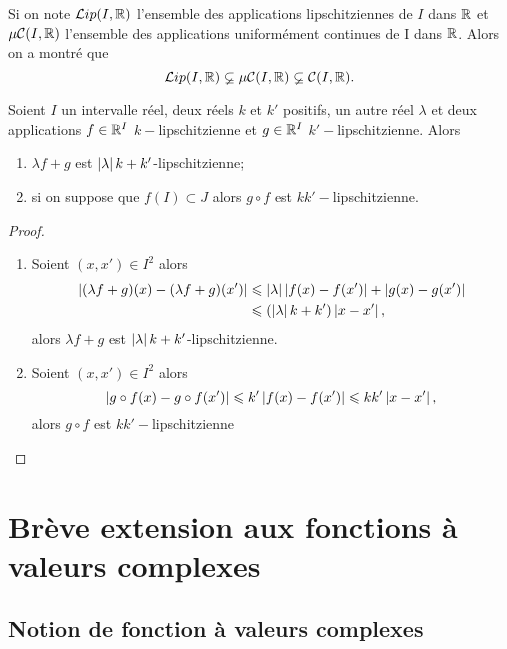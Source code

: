 Si on note \(\mathcal{L}ip(I,\mathbb{R})\) l'ensemble des applications lipschitziennes de \(I\) dans \(\mathbb{R}\) et \(\mu\mathcal{C}(I,\mathbb{R})\) l'ensemble des applications uniformément continues de I dans \(\mathbb{R}\). Alors on a montré que
\begin{equation}
  \mathcal{L}ip(I,\mathbb{R}) \varsubsetneq \mu\mathcal{C}(I,\mathbb{R}) \varsubsetneq \mathcal{C}(I,\mathbb{R}).
\end{equation}

\begin{prop}
  Soient \(I\) un intervalle réel, deux réels \(k\) et \(k'\) positifs, un autre réel \(\lambda\) et deux applications \(f\in \mathbb{R}^I\) \(k-\)lipschitzienne et \(g\in \mathbb{R}^I\) \(k'-\)lipschitzienne. Alors
  \begin{enumerate}
  \item \(\lambda f+g\) est \(\left\lvert\lambda\right\rvert k+k'\)-lipschitzienne;
  \item si on suppose que \(f(I) \subset J\) alors \(g \circ f\) est \(kk'-\)lipschitzienne.
  \end{enumerate}
\end{prop}
\begin{proof}
  \begin{enumerate}
  \item Soient \((x,x') \in I^2\) alors
    \begin{align}
      \left\lvert(\lambda f+g)(x)-(\lambda f+g)(x')\right\rvert &\leqslant \left\lvert\lambda\right\rvert \left\lvert f(x)-f(x')\right\rvert+\left\lvert g(x)-g(x')\right\rvert\\
      &\leqslant (\left\lvert\lambda\right\rvert k+k')\left\lvert x-x'\right\rvert,
    \end{align}
    alors \(\lambda f+g\) est \(\left\lvert\lambda\right\rvert k+k'\)-lipschitzienne.
  \item Soient \((x,x') \in I^2\) alors
    \begin{equation}
      \left\lvert g \circ f(x)-g \circ f(x')\right\rvert \leqslant k' \left\lvert f(x)-f(x')\right\rvert \leqslant kk' \left\lvert x-x'\right\rvert,
    \end{equation}
    alors \(g \circ f\) est \(kk'-\)lipschitzienne
  \end{enumerate}
\end{proof}

\section[Brève extension aux fonctions complexes]{Brève extension aux fonctions à valeurs complexes}

\subsection{Notion de fonction à valeurs complexes}

